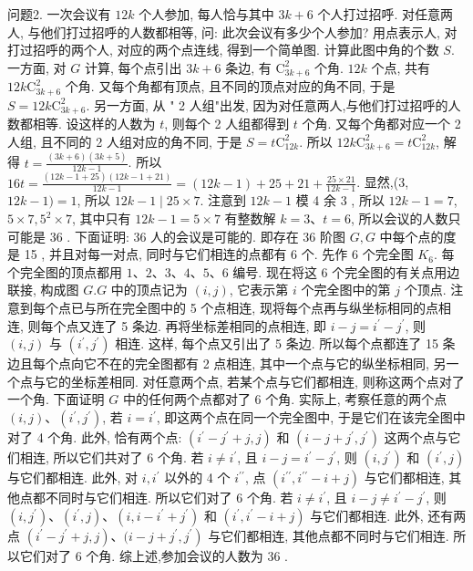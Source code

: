 问题2. 一次会议有 $12 k$ 个人参加, 每人恰与其中 $3 k+6$ 个人打过招呼.
对任意两人, 与他们打过招呼的人数都相等, 问: 此次会议有多少个人参加?
用点表示人, 对打过招呼的两个人, 对应的两个点连线, 得到一个简单图.
计算此图中角的个数 $S$. 一方面, 对 $G$ 计算, 每个点引出 $3 k+6$ 条边, 有 $\mathrm{C}_{3 k+6}^2$ 个角.
$12 k$ 个点, 共有 $12 k \mathrm{C}_{3 k+6}^2$ 个角.
又每个角都有顶点, 且不同的顶点对应的角不同, 于是 $S=12 k \mathrm{C}_{3 k+6}^2$. 另一方面, 从 " 2 人组"出发, 因为对任意两人,与他们打过招呼的人数都相等.
设这样的人数为 $t$, 则每个 2 人组都得到 $t$ 个角.
又每个角都对应一个 2 人组, 且不同的 2 人组对应的角不同, 于是 $S= t \mathrm{C}_{12 k}^2$. 所以 $12 k \mathrm{C}_{3 k+6}^2=t \mathrm{C}_{12 k}^2$, 解得 $t=\frac{(3 k+6)(3 k+5)}{12 k-1}$. 所以 $16 t= \frac{(12 k-1+25)(12 k-1+21)}{12 k-1}=(12 k-1)+25+21+\frac{25 \times 21}{12 k-1}$. 显然,(3, $12 k-1)=1$, 所以 $12 k-1 \mid 25 \times 7$. 注意到 $12 k-1$ 模 4 余 3 , 所以 $12 k-1=7$, $5 \times 7,5^2 \times 7$, 其中只有 $12 k-1=5 \times 7$ 有整数解 $k=3 、 t=6$, 所以会议的人数只可能是 36 . 下面证明: 36 人的会议是可能的.
即存在 36 阶图 $G, G$ 中每个点的度是 15 , 并且对每一对点, 同时与它们相连的点都有 6 个.
先作 6 个完全图 $K_6$. 每个完全图的顶点都用 $1 、 2 、 3 、 4 、 5 、 6$ 编号.
现在将这 6 个完全图的有关点用边联接, 构成图 $G . G$ 中的顶点记为 $(i, j)$, 它表示第 $i$ 个完全图中的第 $j$ 个顶点.
注意到每个点已与所在完全图中的 5 个点相连, 现将每个点再与纵坐标相同的点相连, 则每个点又连了 5 条边.
再将坐标差相同的点相连, 即 $i-j=i^{\prime}-j^{\prime}$, 则 $(i, j)$ 与 $\left(i^{\prime}, j^{\prime}\right)$ 相连.
这样, 每个点又引出了 5 条边.
所以每个点都连了 15 条边且每个点向它不在的完全图都有 2 点相连, 其中一个点与它的纵坐标相同, 另一个点与它的坐标差相同.
对任意两个点, 若某个点与它们都相连, 则称这两个点对了一个角.
下面证明 $G$ 中的任何两个点都对了 6 个角.
实际上, 考察任意的两个点 $(i, j) 、\left(i^{\prime}, j^{\prime}\right)$, 若 $i=i^{\prime}$, 即这两个点在同一个完全图中, 于是它们在该完全图中对了 4 个角.
此外, 恰有两个点: $\left(i^{\prime}-\right. \left.j^{\prime}+j, j\right)$ 和 $\left(i-j+j^{\prime}, j^{\prime}\right)$ 这两个点与它们相连, 所以它们共对了 6 个角.
若 $i \neq i^{\prime}$, 且 $i-j=i^{\prime}-j^{\prime}$, 则 $\left(i, j^{\prime}\right)$ 和 $\left(i^{\prime}, j\right)$ 与它们都相连.
此外, 对 $i, i^{\prime}$ 以外的 4 个 $i^{\prime \prime}$, 点 $\left(i^{\prime \prime}, i^{\prime \prime}-i+j\right)$ 与它们都相连, 其他点都不同时与它们相连.
所以它们对了 6 个角.
若 $i \neq i^{\prime}$, 且 $i-j \neq i^{\prime}-j^{\prime}$, 则 $\left(i, j^{\prime}\right) 、\left(i^{\prime}, j\right) 、\left(i, i-i^{\prime}+\right. \left.j^{\prime}\right)$ 和 $\left(i^{\prime}, i^{\prime}-i+j\right)$ 与它们都相连.
此外, 还有两点 $\left(i^{\prime}-j^{\prime}+j, j\right) 、(i-j+ \left.j^{\prime}, j^{\prime}\right)$ 与它们都相连, 其他点都不同时与它们相连.
所以它们对了 6 个角.
综上述,参加会议的人数为 36 .



